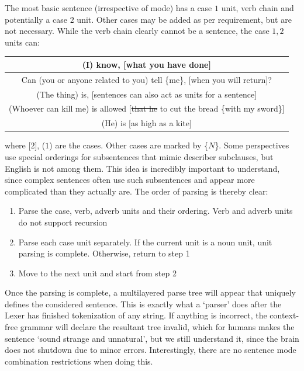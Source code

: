 The most basic  sentence (irrespective of mode) has a case $1$ unit, verb chain and potentially a case $2$ unit. Other cases may be added as per requirement, but are not necessary. While the verb chain clearly cannot be a sentence, the case $1, 2$ units can:
\begin{example}
    \begin{tabular}{c}
        (I) know, [what you have done]\\\hline
        Can (you or anyone related to you) tell \{me\}, [when you will return]?\\\hline
        (The thing) is, [sentences can also act as units for a sentence]\\\hline
        (Whoever can kill me) is allowed [\sout{that he} to cut the bread \{with my sword\}]\\\hline
        (He) is [as high as a kite]
    \end{tabular}
\end{example}
where [$2$], ($1$) are the cases. Other cases are marked by \{$N$\}. Some perspectives use special orderings for subsentences that mimic describer subclauses, but English is not among them. This idea is incredibly important to understand, since complex sentences often use such subsentences and appear more complicated than they actually are. The order of parsing is thereby clear:
\begin{syntax}
    \begin{enumerate}
        \item Parse the case, verb, adverb units and their ordering. Verb and adverb units do not support recursion
        \item Parse each case unit separately. If the current unit is a noun unit, unit parsing is complete. Otherwise, return to step 1
        \item Move to the next unit and start from step 2
    \end{enumerate}
\end{syntax}
Once the parsing is complete, a multilayered parse tree will appear that uniquely defines the considered sentence. This is exactly what a `parser' does after the Lexer has finished tokenization of any string. If anything is incorrect, the context-free grammar will declare the resultant tree invalid, which for humans makes the sentence `sound strange and unnatural', but we still understand it, since the brain does not shutdown due to minor errors. Interestingly, there are no sentence mode combination restrictions when doing this.


